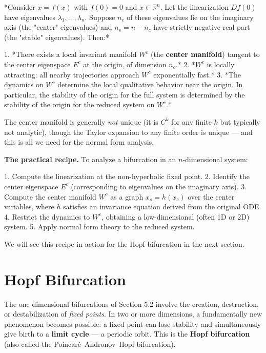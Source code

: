 \begin{theorem}\label{thm:5.5}
*Consider $\dot{x} = f(x)$ with $f(0) = 0$ and $x \in \mathbb{R}^n$. Let the linearization $Df(0)$ have eigenvalues $\lambda_1, \ldots, \lambda_n$. Suppose $n_c$ of these eigenvalues lie on the imaginary axis (the "center" eigenvalues) and $n_s = n - n_c$ have strictly negative real part (the "stable" eigenvalues). Then:*

1. *There exists a local invariant manifold $W^c$ (the \textbf{center manifold}) tangent to the center eigenspace $E^c$ at the origin, of dimension $n_c$.*
2. *$W^c$ is locally attracting: all nearby trajectories approach $W^c$ exponentially fast.*
3. *The dynamics on $W^c$ determine the local qualitative behavior near the origin. In particular, the stability of the origin for the full system is determined by the stability of the origin for the reduced system on $W^c$.*

The center manifold is generally \textit{not} unique (it is $C^k$ for any finite $k$ but typically not analytic), though the Taylor expansion to any finite order is unique --- and this is all we need for the normal form analysis.

\textbf{The practical recipe.} To analyze a bifurcation in an $n$-dimensional system:

1. Compute the linearization at the non-hyperbolic fixed point.
2. Identify the center eigenspace $E^c$ (corresponding to eigenvalues on the imaginary axis).
3. Compute the center manifold $W^c$ as a graph $x_s = h(x_c)$ over the center variables, where $h$ satisfies an invariance equation derived from the original ODE.
4. Restrict the dynamics to $W^c$, obtaining a low-dimensional (often 1D or 2D) system.
5. Apply normal form theory to the reduced system.

We will see this recipe in action for the Hopf bifurcation in the next section.


\bigskip

\end{theorem}


\section{Hopf Bifurcation}\label{sec:5.4}

The one-dimensional bifurcations of Section 5.2 involve the creation, destruction, or destabilization of \textit{fixed points}. In two or more dimensions, a fundamentally new phenomenon becomes possible: a fixed point can lose stability and simultaneously give birth to a \textbf{limit cycle} --- a periodic orbit. This is the \textbf{Hopf bifurcation} (also called the Poincaré--Andronov--Hopf bifurcation).

